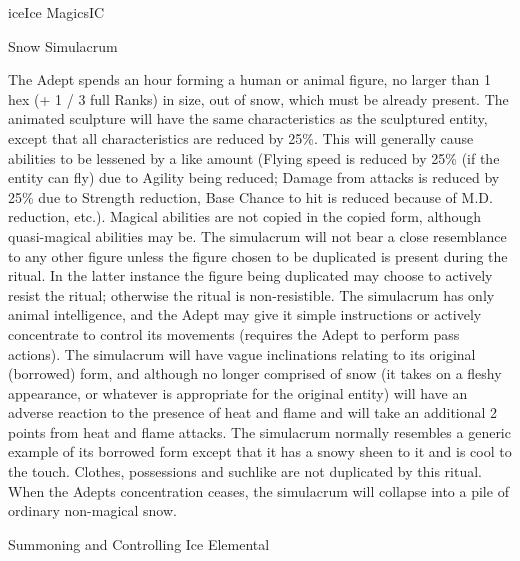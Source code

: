 \begin{college}[1.5]{ice}{Ice Magics}{IC}
\begin{ritual}[R-1]{Snow Simulacrum}

\begin{effects}
The Adept spends an hour forming a human or animal figure, no larger
than 1 hex (+ 1 / 3 full Ranks) in size, out of snow, which must be
already present. The animated sculpture will have the same
characteristics as the sculptured entity, except that all
characteristics are reduced by 25\%. This will generally cause
abilities to be lessened by a like amount (\eg Flying speed is reduced
by 25\% (if the entity can fly) due to Agility being reduced; Damage
from attacks is reduced by 25\% due to Strength reduction, Base Chance
to hit is reduced because of M.D. reduction, etc.).  Magical abilities
are not copied in the copied form, although quasi-magical abilities
may be.  The simulacrum will not bear a close resemblance to any other
figure unless the figure chosen to be duplicated is present during the
ritual. In the latter instance the figure being duplicated may choose
to actively resist the ritual; otherwise the ritual is
non-resistible. The simulacrum has only animal intelligence, and the
Adept may give it simple instructions or actively concentrate to
control its movements (requires the Adept to perform pass actions).
The simulacrum will have vague inclinations relating to its original
(borrowed) form, and although no longer comprised of snow (it takes on
a fleshy appearance, or whatever is appropriate for the original
entity) will have an adverse reaction to the presence of heat and
flame and will take an additional 2 points from heat and flame
attacks. The simulacrum normally resembles a generic example of its
borrowed form except that it has a snowy sheen to it and is cool to
the touch. Clothes, possessions and suchlike are not duplicated by
this ritual. When the Adepts concentration ceases, the simulacrum will
collapse into a pile of ordinary non-magical snow.
\end{effects}
\end{ritual}

\begin{ritual}[R-2]{Summoning and Controlling Ice Elemental}


\end{ritual}
\end{college}
